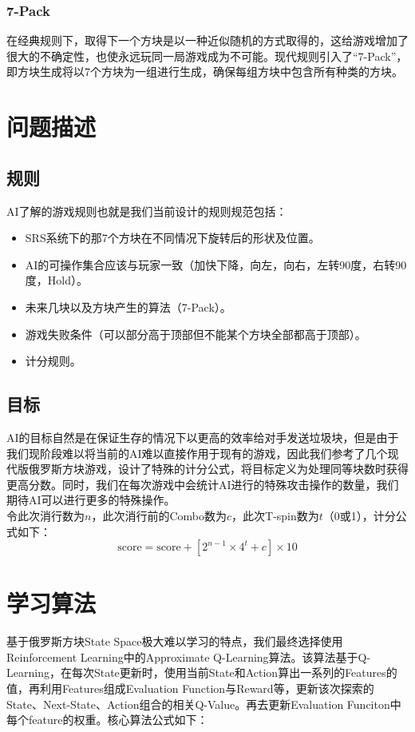 \documentclass[10pt,UTF8]{article}
\begin{document}
\begin{multicols}{2}
\subsubsection{7-Pack}

在经典规则下，取得下一个方块是以一种近似随机的方式取得的，这给游戏增加了很大的不确定性，也使永远玩同一局游戏成为不可能。现代规则引入了“7-Pack”，即方块生成将以7个方块为一组进行生成，确保每组方块中包含所有种类的方块。

\section{问题描述}

\subsection{规则}

AI了解的游戏规则也就是我们当前设计的规则规范包括：\\

\begin{itemize}
    \itemsep-5pt
    \item SRS系统下的那7个方块在不同情况下旋转后的形状及位置。
    \item AI的可操作集合应该与玩家一致（加快下降，向左，向右，左转90度，右转90度，Hold）。
    \item 未来几块以及方块产生的算法（7-Pack）。
    \item 游戏失败条件（可以部分高于顶部但不能某个方块全部都高于顶部）。
    \item 计分规则。
\end{itemize}

\subsection{目标}

AI的目标自然是在保证生存的情况下以更高的效率给对手发送垃圾块，但是由于我们现阶段难以将当前的AI难以直接作用于现有的游戏，因此我们参考了几个现代版俄罗斯方块游戏，设计了特殊的计分公式，将目标定义为处理同等块数时获得更高分数。同时，我们在每次游戏中会统计AI进行的特殊攻击操作的数量，我们期待AI可以进行更多的特殊操作。\\

令此次消行数为$n$，此次消行前的Combo数为$c$，此次T-spin数为$t$（0或1），计分公式如下：\\
$$
\mbox{score} = \mbox{score} + [2^{n-1} \times 4^t + c] \times 10
$$


\section{学习算法}
基于俄罗斯方块State Space极大难以学习的特点，我们最终选择使用Reinforcement Learning中的Approximate Q-Learning算法。该算法基于Q-Learning，在每次State更新时，使用当前State和Action算出一系列的Features的值，再利用Features组成Evaluation Function与Reward等，更新该次探索的State、Next-State、Action组合的相关Q-Value。再去更新Evaluation Funciton中每个feature的权重。核心算法公式如下：


\end{multicols}
\end{document}
